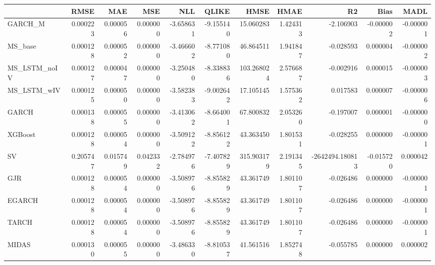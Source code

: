 \begin{tabular}{lrrrrrrrrrr}
\toprule
 & RMSE & MAE & MSE & NLL & QLIKE & HMSE & HMAE & R2 & Bias & MADL \\
\midrule
GARCH_M & 0.000223 & 0.000056 & 0.000000 & -3.658631 & -9.155140 & 15.060283 & 1.424313 & -2.106903 & -0.000002 & -0.000001 \\
MS_base & 0.000128 & 0.000052 & 0.000000 & -3.466602 & -8.771080 & 46.864511 & 1.941847 & -0.028593 & 0.000004 & -0.000002 \\
MS_LSTM_noIV & 0.000127 & 0.000047 & 0.000000 & -3.250480 & -8.338836 & 103.268024 & 2.576687 & -0.002916 & 0.000015 & -0.000003 \\
MS_LSTM_wIV & 0.000125 & 0.000050 & 0.000000 & -3.582383 & -9.002642 & 17.105145 & 1.575362 & 0.017583 & 0.000007 & -0.000006 \\
GARCH & 0.000138 & 0.000055 & 0.000000 & -3.413062 & -8.664001 & 67.800832 & 2.053260 & -0.197007 & 0.000001 & -0.000000 \\
XGBoost & 0.000128 & 0.000054 & 0.000000 & -3.509122 & -8.856122 & 43.363450 & 1.801531 & -0.028255 & 0.000000 & -0.000001 \\
SV & 0.205747 & 0.015749 & 0.042332 & -2.784976 & -7.407829 & 315.903179 & 2.191345 & -2642494.180813 & -0.015720 & 0.000042 \\
GJR & 0.000128 & 0.000054 & 0.000000 & -3.508976 & -8.855829 & 43.361749 & 1.801107 & -0.026486 & 0.000000 & -0.000001 \\
EGARCH & 0.000128 & 0.000054 & 0.000000 & -3.508976 & -8.855829 & 43.361749 & 1.801107 & -0.026486 & 0.000000 & -0.000001 \\
TARCH & 0.000128 & 0.000054 & 0.000000 & -3.508976 & -8.855829 & 43.361749 & 1.801107 & -0.026486 & 0.000000 & -0.000001 \\
MIDAS & 0.000130 & 0.000055 & 0.000000 & -3.486330 & -8.810537 & 41.561516 & 1.852748 & -0.055785 & 0.000000 & 0.000002 \\
\bottomrule
\end{tabular}
